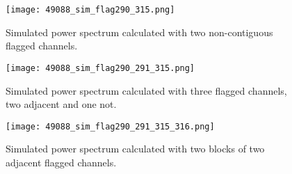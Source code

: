 \documentclass[12pt]{article}
\begin{document}
\begin{figure}[p]
	\centering
	\texttt{[image: 49088\_sim\_flag290\_315.png]}
	\caption[Model power spectrum calculated with flagged time integrations and two non-contiguous flagged channels]{Simulated power spectrum calculated with two non-contiguous flagged channels.}
	\label{fig:sim_flag_chan290_315}
\end{figure}

\begin{figure}[p]
	\centering
	\texttt{[image: 49088\_sim\_flag290\_291\_315.png]}
	\caption[Model power spectrum calculated with flagged time integrations and three flagged channels (two contiguous, one not)]{Simulated power spectrum calculated with three flagged channels, two adjacent and one not.}
	\label{fig:sim_flag_chan290_291_315}
\end{figure}

\begin{figure}[p]
	\centering
	\texttt{[image: 49088\_sim\_flag290\_291\_315\_316.png]}
	\caption[Model power spectrum calculated with flagged time integrations and four flagged channels (two blocks of two channels)]{Simulated power spectrum calculated with two blocks of two adjacent flagged channels.}
	\label{fig:sim_flag_chan290_291_315_316}
\end{figure}
\end{document}
